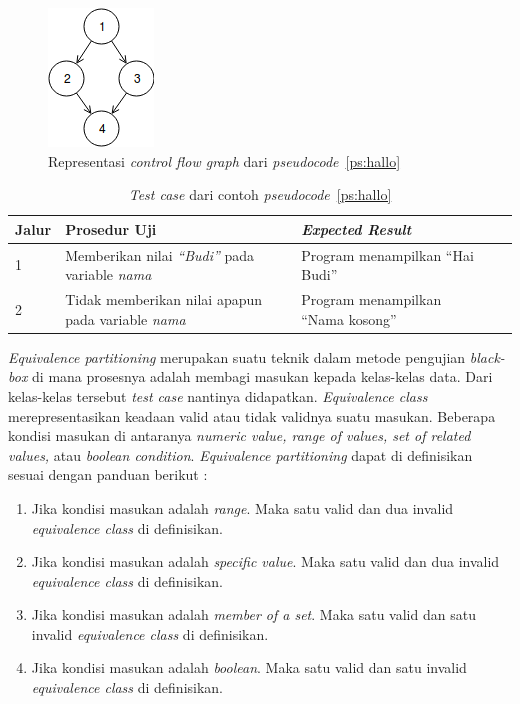 \begin{figure}[H]
  \centering
  \includegraphics[width=.14\linewidth]{img/contoh-flow-graph}
  \caption{Representasi \emph{control flow graph} dari \emph{pseudocode}~\ref{ps:hallo}}\label{cfg:hallo}
\end{figure}

\begin{longtable}{|P{.06\textwidth}|P{.30\textwidth}|P{.30\textwidth}|P{.10\textwidth}|P{.08\textwidth}|}
  \caption{\emph{Test case} dari contoh \emph{pseudocode}~\ref{ps:hallo}} \label{tc:hallo}\\
  \hline
  \textbf{Jalur} & \textbf{Prosedur Uji} & \textbf{\emph{Expected Result}} \\\hline
  1 & Memberikan nilai \emph{``Budi''} pada variable \emph{nama} &
                                                                   Program menampilkan ``Hai Budi'' \\\hline
  2 & Tidak memberikan nilai apapun pada variable \emph{nama} &
                                                                   Program menampilkan ``Nama kosong'' \\\hline

\end{longtable}


\emph{Equivalence partitioning} merupakan suatu teknik dalam metode
pengujian \emph{black-box} di mana prosesnya adalah membagi masukan
kepada kelas-kelas data. Dari kelas-kelas tersebut \emph{test case}
nantinya didapatkan. \emph{Equivalence class} merepresentasikan
keadaan valid atau tidak validnya suatu masukan. Beberapa kondisi
masukan di antaranya \emph{numeric value, range of values, set of
related values,} atau \emph{boolean condition}. \emph{Equivalence
partitioning} dapat di definisikan sesuai dengan panduan berikut
\parencite{presman2010software}:

\begin{enumerate}[
leftmargin=0pt, itemindent=20pt,
labelwidth=15pt, labelsep=5pt, listparindent=0.7cm,
align=left]

\item Jika kondisi masukan adalah \emph{range}. Maka satu valid dan
  dua invalid \emph{equivalence class} di definisikan.
\item Jika kondisi masukan adalah \emph{specific value}. Maka satu valid dan
  dua invalid \emph{equivalence class} di definisikan.
\item Jika kondisi masukan adalah \emph{member of a set}. Maka satu valid dan
  satu invalid \emph{equivalence class} di definisikan.
\item Jika kondisi masukan adalah \emph{boolean}. Maka satu valid dan
  satu invalid \emph{equivalence class} di definisikan.

\end{enumerate}

